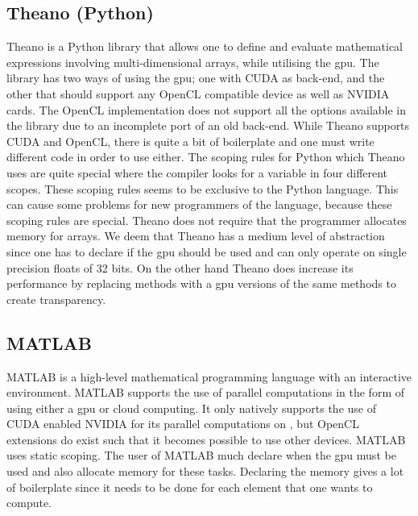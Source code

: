\subsection{Theano (Python)}
Theano is a Python library that allows one to define and evaluate mathematical expressions involving multi-dimensional arrays, while utilising the \acrshort{gpu}.
The library has two ways of using the \acrshort{gpu}; one with CUDA as back-end, and the other that should support any OpenCL compatible device as well as NVIDIA cards.
The OpenCL implementation does not support all the options available in the library due to an incomplete port of an old back-end.
While Theano supports CUDA and OpenCL, there is quite a bit of boilerplate and one must write different code in order to use either.	
The scoping rules for Python which Theano uses are quite special where the compiler looks for a variable in four different scopes.
These scoping rules seems to be exclusive to the Python language.
This can cause some problems for new programmers of the language, because these scoping rules are special.
Theano does not require that the programmer allocates memory for arrays.
We deem that Theano has a medium level of abstraction since one has to declare if the \acrshort{gpu} should be used and can only operate on single precision floats of 32 bits.
On the other hand Theano does increase its performance by replacing methods with a \acrshort{gpu} versions of the same methods to create transparency.\citep{Theano,Theano_GPU,bergstratheano, LEGB}

\subsection{MATLAB}
MATLAB is a high-level mathematical programming language with an interactive environment.
MATLAB supports the use of parallel computations in the form of using either a \acrshort{gpu} or cloud computing.
It only natively supports the use of CUDA enabled NVIDIA  for its parallel computations on , but OpenCL extensions do exist such that it becomes possible to use other devices.
MATLAB uses static scoping.
The user of MATLAB much declare when the \acrshort{gpu} must be used and also allocate memory for these tasks.
Declaring the memory gives a lot of boilerplate since it needs to be done for each element that one wants to compute.\citep{MATLAB_backend,MATLAB_benchmark}

